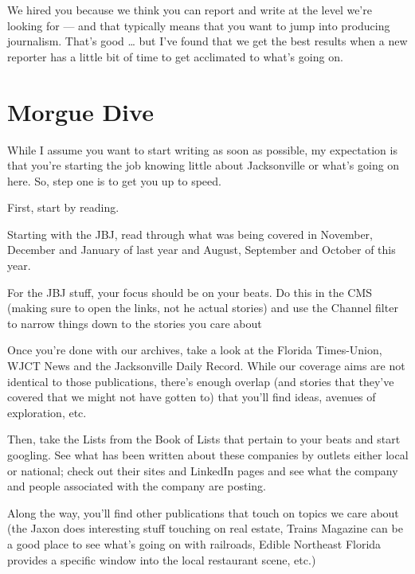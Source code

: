 \documentclass[
  11pt,
  american,
  letterpaperpaper,
  extrafontsizes,onecolumn,openright
  ]{memoir}
\begin{document}
\leavevmode{}%
\begin{greybox}[frametitle=Onboarding Path]
We hired you because we think you can report and write at the level we're looking for --- and that typically means that you want to jump into producing journalism. That's good \ldots{} but I've found that we get the best results when a new reporter has a little bit of time to get acclimated to what's going on.

\end{greybox}

\hypertarget{morgue-dive}{%
\section*{Morgue Dive}\label{morgue-dive}}

While I assume you want to start writing as soon as possible, my expectation is that you're starting the job knowing little about Jacksonville or what's going on here. So, step one is to get you up to speed.

First, start by reading.

Starting with the JBJ, read through what was being covered in November, December and January of last year and August, September and October of this year.

For the JBJ stuff, your focus should be on your beats. Do this in the CMS (making sure to open the links, not he actual stories) and use the Channel filter to narrow things down to the stories you care about

Once you're done with our archives, take a look at the Florida Times-Union, WJCT News and the Jacksonville Daily Record. While our coverage aims are not identical to those publications, there's enough overlap (and stories that they've covered that we might not have gotten to) that you'll find ideas, avenues of exploration, etc.

Then, take the Lists from the Book of Lists that pertain to your beats and start googling. See what has been written about these companies by outlets either local or national; check out their sites and LinkedIn pages and see what the company and people associated with the company are posting.

Along the way, you'll find other publications that touch on topics we care about (the Jaxon does interesting stuff touching on real estate, Trains Magazine can be a good place to see what's going on with railroads, Edible Northeast Florida provides a specific window into the local restaurant scene, etc.)
\end{document}
